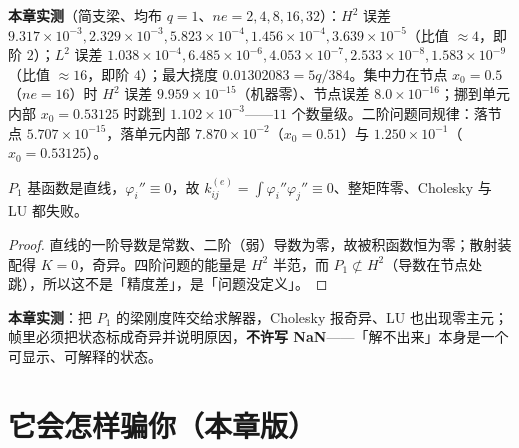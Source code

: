 \textbf{本章实测}（简支梁、均布 $q=1$、$ne=2,4,8,16,32$）：$H^2$ 误差
$9.317\times10^{-3},2.329\times10^{-3},5.823\times10^{-4},1.456\times10^{-4},3.639\times10^{-5}$（比值
$\approx4$，即阶 $2$）；$L^2$ 误差
$1.038\times10^{-4},6.485\times10^{-6},4.053\times10^{-7},2.533\times10^{-8},1.583\times10^{-9}$（比值
$\approx16$，即阶 $4$）；最大挠度 $0.01302083=5q/384$。集中力在节点 $x_0=0.5$（$ne=16$）时 $H^2$ 误差
$9.959\times10^{-15}$（机器零）、节点误差 $8.0\times10^{-16}$；挪到单元内部 $x_0=0.53125$ 时跳到
$1.102\times10^{-3}$——$11$ 个数量级。二阶问题同规律：落节点 $5.707\times10^{-15}$，落单元内部
$7.870\times10^{-2}$（$x_0=0.51$）与 $1.250\times10^{-1}$（$x_0=0.53125$）。

\begin{corollary}
\label{cor:p1beam}
$P_1$ 基函数是直线，$\varphi_i''\equiv0$，故
$k^{(e)}_{ij}=\int\varphi_i''\varphi_j''\equiv0$、整矩阵零、Cholesky 与 LU 都失败。
\end{corollary}
\begin{proof}
直线的一阶导数是常数、二阶（弱）导数为零，故被积函数恒为零；散射装配得 $K=0$，奇异。四阶问题的能量是 $H^2$ 半范，而 $P_1\not\subset
H^2$（导数在节点处跳），所以这不是「精度差」，是「问题没定义」。
\end{proof}

\textbf{本章实测}：把 $P_1$ 的梁刚度阵交给求解器，Cholesky 报奇异、LU 也出现零主元；帧里必须把状态标成奇异并说明原因，\textbf{不许写
NaN}——「解不出来」本身是一个可显示、可解释的状态。

\section{它会怎样骗你（本章版）}


